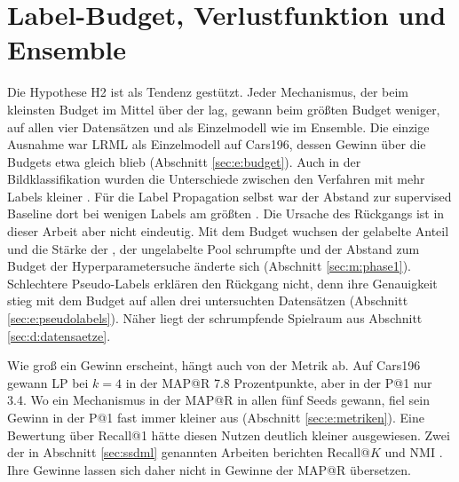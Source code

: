 \section{Label-Budget, Verlustfunktion und Ensemble}
\label{sec:d:faktoren}

Die Hypothese H2 ist als Tendenz gestützt. Jeder Mechanismus, der beim kleinsten Budget im Mittel über der \UEBL lag, gewann beim größten Budget weniger, auf allen vier Datensätzen und als Einzelmodell wie im Ensemble. Die einzige Ausnahme war \ac{LRML} als Einzelmodell auf Cars196, dessen Gewinn über die Budgets etwa gleich blieb (Abschnitt \ref{sec:e:budget}). Auch in der Bildklassifikation wurden die Unterschiede zwischen den Verfahren mit mehr Labels kleiner \cite{oliver_realistic_2018}. Für die Label Propagation selbst war der Abstand zur supervised Baseline dort bei wenigen Labels am größten \cite{iscen_label_2019}. Die Ursache des Rückgangs ist in dieser Arbeit aber nicht eindeutig. Mit dem Budget wuchsen der gelabelte Anteil und die Stärke der \UEBL, der ungelabelte Pool schrumpfte und der Abstand zum Budget der Hyperparametersuche änderte sich (Abschnitt \ref{sec:m:phase1}). Schlechtere Pseudo-Labels erklären den Rückgang nicht, denn ihre Genauigkeit stieg mit dem Budget auf allen drei untersuchten Datensätzen (Abschnitt \ref{sec:e:pseudolabels}). Näher liegt der schrumpfende Spielraum aus Abschnitt \ref{sec:d:datensaetze}.

Wie groß ein Gewinn erscheint, hängt auch von der Metrik ab. Auf Cars196 gewann \ac{LP} bei $k=4$ in der \ac{MAP@R} \num{7.8} Prozentpunkte, aber in der \ac{P@1} nur \num{3.4}. Wo ein Mechanismus in der \ac{MAP@R} in allen fünf Seeds gewann, fiel sein Gewinn in der \ac{P@1} fast immer kleiner aus (Abschnitt \ref{sec:e:metriken}). Eine Bewertung über Recall@1 hätte diesen Nutzen deutlich kleiner ausgewiesen. Zwei der in Abschnitt \ref{sec:ssdml} genannten Arbeiten berichten Recall@$K$ und \ac{NMI} \cite{dutta_semi-supervised_2021, zhuang_deep_2023}. Ihre Gewinne lassen sich daher nicht in Gewinne der \ac{MAP@R} übersetzen.

